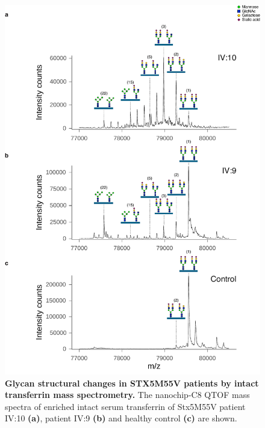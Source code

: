 \begin{figure}
    \includegraphics[keepaspectratio=true,scale=0.6]{chapters/chapter6/chapter6_SupplementaryFigure2.pdf}
    \caption{\textbf{Glycan structural changes in STX5M55V patients by intact transferrin mass spectrometry.} The nanochip-C8 QTOF mass spectra of enriched intact serum transferrin of Stx5M55V patient IV:10 \textbf{(a)}, patient IV:9 \textbf{(b)} and healthy control \textbf{(c)} are shown.}
    \label{fig:ch6supfig2}
\end{figure}

\clearpage

